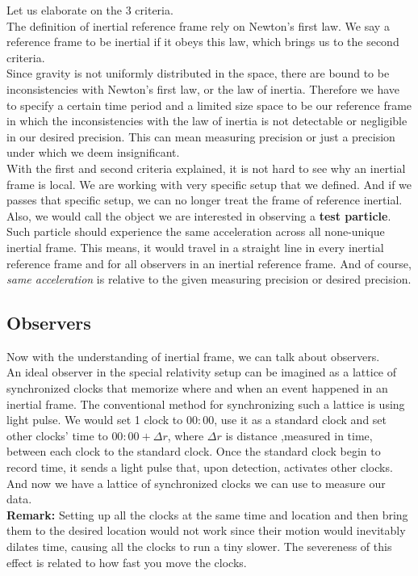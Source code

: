 \documentclass[12pt]{book}
\begin{document}
Let us elaborate on the 3 criteria.\\
\newline
The definition of inertial reference frame rely on Newton's first law. We say a reference frame to be inertial if it obeys this law, which brings us to the second criteria.\\
\newline
Since gravity is not uniformly distributed in the space, there are bound to be inconsistencies with Newton's first law, or the law of inertia. Therefore we have to specify a certain time period and a limited size space to be our reference frame in which the inconsistencies with the law of inertia is not detectable or negligible in our desired precision. This can mean measuring precision or just a precision under which we deem insignificant. \\
\newline
With the first and second criteria explained, it is not hard to see why an inertial frame is local. We are working with very specific setup that we defined. And if we passes that specific setup, we can no longer treat the frame of reference inertial.\\
\newline
Also, we would call the object we are interested in observing a \textbf{test particle}. Such particle should experience the same acceleration across all none-unique inertial frame. This means, it would travel in a straight line in every inertial reference frame and for all observers in an inertial reference frame. And of course, \textit{same acceleration} is relative to the given measuring precision or desired precision. 

\subsection{Observers}
Now with the understanding of inertial frame, we can talk about observers.\\
\newline
An ideal observer in the special relativity setup can be imagined as a lattice of synchronized clocks that memorize where and when an event happened in an inertial frame. The conventional method for synchronizing such a lattice is using light pulse. We would set 1 clock to $00:00$, use it as a standard clock and set other clocks' time to $00:00+\Delta r$, where $\Delta r$ is distance ,measured in time, between each clock to the standard clock. Once the standard clock begin to record time, it sends a light pulse that, upon detection, activates other clocks. And now we have a lattice of synchronized clocks we can use to measure our data.\\
\newline
\textbf{Remark:} Setting up all the clocks at the same time and location and then bring them to the desired location would not work since their motion would inevitably dilates time, causing all the clocks to run a tiny slower. The severeness of this effect is related to how fast you move the clocks. 
\end{document}
